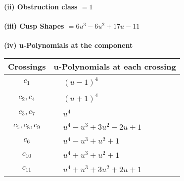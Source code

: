 \documentclass[1p]{elsarticle_modified}
\theoremstyle{definition}
\begin{document}
\flushleft \textbf{(ii) Obstruction class $= 1$}\\~\\
\flushleft \textbf{(iii) Cusp Shapes $= 6 u^3-6 u^2+17 u-11$}\\~\\
\newpage\renewcommand{\arraystretch}{1}
\flushleft \textbf{(iv) u-Polynomials at the component}\newline \\
\begin{tabular}{m{50pt}|m{274pt}}
Crossings & \hspace{64pt}u-Polynomials at each crossing \\
\hline $$\begin{aligned}c_{1}\end{aligned}$$&$\begin{aligned}
&(u-1)^4
\end{aligned}$\\
\hline $$\begin{aligned}c_{2},c_{4}\end{aligned}$$&$\begin{aligned}
&(u+1)^4
\end{aligned}$\\
\hline $$\begin{aligned}c_{3},c_{7}\end{aligned}$$&$\begin{aligned}
&u^4
\end{aligned}$\\
\hline $$\begin{aligned}c_{5},c_{8},c_{9}\end{aligned}$$&$\begin{aligned}
&u^4- u^3+3 u^2-2 u+1
\end{aligned}$\\
\hline $$\begin{aligned}c_{6}\end{aligned}$$&$\begin{aligned}
&u^4- u^3+u^2+1
\end{aligned}$\\
\hline $$\begin{aligned}c_{10}\end{aligned}$$&$\begin{aligned}
&u^4+u^3+u^2+1
\end{aligned}$\\
\hline $$\begin{aligned}c_{11}\end{aligned}$$&$\begin{aligned}
&u^4+u^3+3 u^2+2 u+1
\end{aligned}$\\
\hline
\end{tabular}\\~\\
\end{document}

